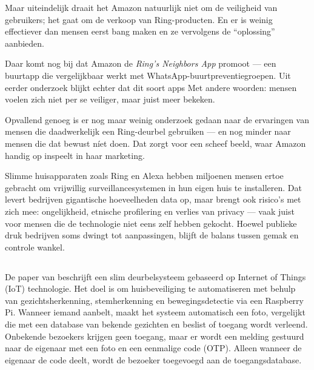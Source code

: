 \documentclass[nonacm,sigconf]{acmart}
\begin{document}
    Maar uiteindelijk draait het Amazon natuurlijk niet om de veiligheid van gebruikers; het gaat om de verkoop van Ring-producten.
    En er is weinig effectiever dan mensen eerst bang maken en ze vervolgens de “oplossing” aanbieden.

    Daar komt nog bij dat Amazon de \textit{Ring’s Neighbors App} promoot — een buurtapp die vergelijkbaar werkt met WhatsApp-buurtpreventiegroepen.
    Uit eerder onderzoek blijkt echter dat dit soort apps
    Met andere woorden: mensen voelen zich niet per se veiliger, maar juist meer bekeken.

    Opvallend genoeg is er nog maar weinig onderzoek gedaan naar de ervaringen van mensen die daadwerkelijk een Ring-deurbel gebruiken — en nog minder naar mensen die dat bewust níet doen.
    Dat zorgt voor een scheef beeld, waar Amazon handig op inspeelt in haar marketing.

    Slimme huisapparaten zoals Ring en Alexa hebben miljoenen mensen ertoe gebracht om vrijwillig surveillancesystemen in hun eigen huis te installeren.
    Dat levert bedrijven gigantische hoeveelheden data op, maar brengt ook risico’s met zich mee: ongelijkheid, etnische profilering en verlies van privacy — vaak juist voor mensen die de technologie niet eens zelf hebben gekocht.
    Hoewel publieke druk bedrijven soms dwingt tot aanpassingen, blijft de balans tussen gemak en controle wankel.


    \subsection{}

    De paper van \parencite{chaudhari2020smart} beschrijft een slim deurbelsysteem gebaseerd op Internet of Things (IoT) technologie.
    Het doel is om huisbeveiliging te automatiseren met behulp van gezichtsherkenning, stemherkenning en bewegingsdetectie via een Raspberry Pi.
    Wanneer iemand aanbelt, maakt het systeem automatisch een foto, vergelijkt die met een database van bekende gezichten en beslist of toegang wordt verleend.
    Onbekende bezoekers krijgen geen toegang, maar er wordt een melding gestuurd naar de eigenaar met een foto en een eenmalige code (OTP). Alleen wanneer de eigenaar de code deelt, wordt de bezoeker toegevoegd aan de toegangsdatabase.
\end{document}
